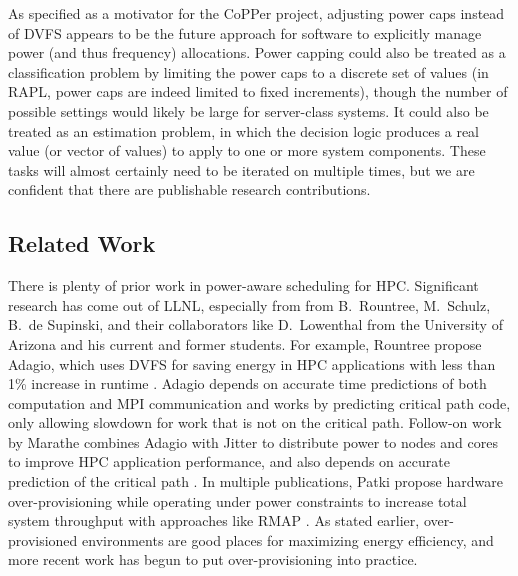 As specified as a motivator for the CoPPer project, adjusting power caps instead of DVFS appears to be the future approach for software to explicitly manage power (and thus frequency) allocations.
Power capping could also be treated as a classification problem by limiting the power caps to a discrete set of values (\eg in RAPL, power caps are indeed limited to fixed increments), though the number of possible settings would likely be large for server-class systems.
It could also be treated as an estimation problem, in which the decision logic produces a real value (or vector of values) to apply to one or more system components.
These tasks will almost certainly need to be iterated on multiple times, but we are confident that there are publishable research contributions.



\subsection{Related Work}
\label{sec:related}


There is plenty of prior work in power-aware scheduling for HPC.
Significant research has come out of LLNL, especially from from B.~Rountree, M.~Schulz, B.~de Supinski, and their collaborators like D.~Lowenthal from the University of Arizona and his current and former students.
For example, Rountree \etal propose Adagio, which uses DVFS for saving energy in HPC applications with less than 1\% increase in runtime \cite{RountreeAdagio}.
Adagio depends on accurate time predictions of both computation and MPI communication and works by predicting critical path code, only allowing slowdown for work that is not on the critical path.
Follow-on work by Marathe \etal combines Adagio with Jitter \cite{Jitter} to distribute power to nodes and cores to improve HPC application performance, and also depends on accurate prediction of the critical path \cite{Marathe2015}.
In multiple publications, Patki \etal propose hardware over-provisioning while operating under power constraints to increase total system throughput with approaches like RMAP \cite{PatkiRMAP}.
As stated earlier, over-provisioned environments are good places for maximizing energy efficiency, and more recent work has begun to put over-provisioning into practice.


